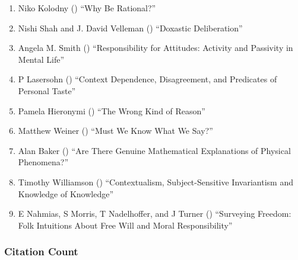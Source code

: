 \documentclass[
  10pt,
  letterpaper,
  DIV=11,
  numbers=noendperiod,
  twoside]{scrartcl}
\providecommand{\tightlist}{%
  \setlength{\itemsep}{0pt}\setlength{\parskip}{0pt}}\usepackage{longtable,booktabs,array}
\begin{document}
\begin{enumerate}
\def\labelenumi{\arabic{enumi}.}
\tightlist
\item
  Niko Kolodny () ``Why Be
  Rational?''
\item
  Nishi Shah and J. David Velleman
  () ``Doxastic Deliberation''
\item
  Angela M. Smith ()
  ``Responsibility for Attitudes: Activity and Passivity in Mental
  Life''
\item
  P Lasersohn () ``Context
  Dependence, Disagreement, and Predicates of Personal Taste''
\item
  Pamela Hieronymi () ``The Wrong
  Kind of Reason''
\item
  Matthew Weiner () ``Must We
  Know What We Say?''
\item
  Alan Baker () ``Are There
  Genuine Mathematical Explanations of Physical Phenomena?''
\item
  Timothy Williamson ()
  ``Contextualism, Subject-Sensitive Invariantism and Knowledge of
  Knowledge''
\item
  E Nahmias, S Morris, T Nadelhoffer, and J Turner
  () ``Surveying Freedom: Folk
  Intuitions About Free Will and Moral Responsibility''
\end{enumerate}

\subsubsection*{Citation Count}\label{sec-count-2005}
\end{document}
